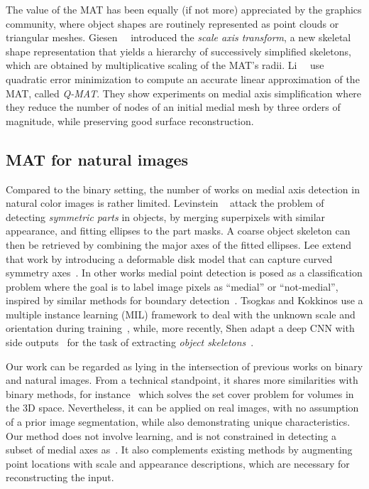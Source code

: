 \documentclass[10pt,twocolumn,letterpaper]{article}
\begin{document}
The value of the MAT has been equally (if not more) appreciated by the graphics community, where object shapes 
are routinely represented as point clouds or triangular meshes.
Giesen~\etal~\cite{giesen2009scale} introduced the \emph{scale axis transform}, a new skeletal shape representation
that yields a hierarchy of successively simplified skeletons, which are obtained by multiplicative scaling of the
MAT's radii.
Li~\etal~\cite{li2015q} use quadratic error minimization to compute an accurate linear approximation of the MAT, called \emph{Q-MAT}.
They show experiments on medial axis simplification where they reduce the number of nodes of an initial medial mesh
by three orders of magnitude, while preserving good surface reconstruction.


\subsection{MAT for natural images}\label{sec:related:natural}
Compared to the binary setting, the number of works on medial axis detection in natural color images is rather limited.
Levinstein \etal~\cite{levinshtein2009multiscale} attack the problem of detecting \emph{symmetric parts} in objects,
by merging superpixels with similar appearance, and fitting ellipses to the part masks.
A coarse object skeleton can then be retrieved by combining the major axes of the fitted ellipses.
Lee \etal extend that work by introducing a deformable disk model that can capture curved symmetry axes~\cite{lee2013detecting}.
In other works medial point detection is posed as a classification problem where the goal is to label image pixels
as ``medial'' or ``not-medial'', inspired by similar methods for boundary detection~\cite{martin2004learning,arbelaez2011contour}.
Tsogkas and Kokkinos use a multiple instance learning (MIL) framework to deal with the unknown scale and orientation 
during training~\cite{tsogkas2012learning}, while, more recently, Shen \etal adapt a deep CNN with 
side outputs~\cite{xie2015holistically} for the task of extracting \emph{object skeletons}~\cite{shen2016object}.

Our work can be regarded as lying in the intersection of previous works on binary and natural images.
From a technical standpoint, it shares more similarities with binary methods, for instance~\cite{stolpner2012medial}
which solves the set cover problem for volumes in the 3D space.
Nevertheless, it can be applied on real images, with no assumption of a prior image segmentation,
while also demonstrating unique characteristics.
Our method does not involve learning, and is not constrained in detecting a subset of
medial axes as~\cite{tsogkas2012learning,shen2016object}.
It also complements existing methods by augmenting point locations with scale and appearance descriptions, which
are necessary for reconstructing the input.
\end{document}
